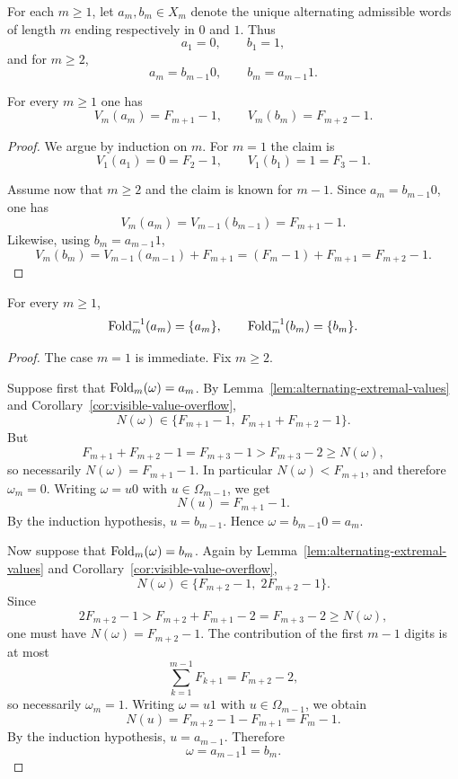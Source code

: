 \begin{definition}
\label{def:alternating-extremal-words}
For each $m\ge 1$, let $a_m,b_m\in X_m$ denote the unique alternating
admissible words of length $m$ ending respectively in $0$ and $1$.  Thus
\[
a_1=0,
\qquad
b_1=1,
\]
and for $m\ge 2$,
\[
a_m=b_{m-1}0,
\qquad
b_m=a_{m-1}1.
\]
\end{definition}

\begin{lemma}
\label{lem:alternating-extremal-values}
For every $m\ge 1$ one has
\[
V_m(a_m)=F_{m+1}-1,
\qquad
V_m(b_m)=F_{m+2}-1.
\]
\end{lemma}

\begin{proof}
We argue by induction on $m$.  For $m=1$ the claim is
\[
V_1(a_1)=0=F_2-1,
\qquad
V_1(b_1)=1=F_3-1.
\]

Assume now that $m\ge 2$ and the claim is known for $m-1$.  Since $a_m=b_{m-1}0$,
one has
\[
V_m(a_m)=V_{m-1}(b_{m-1})=F_{m+1}-1.
\]
Likewise, using $b_m=a_{m-1}1$,
\[
V_m(b_m)=V_{m-1}(a_{m-1})+F_{m+1}
=(F_m-1)+F_{m+1}
=F_{m+2}-1.
\]
\end{proof}

\begin{proposition}
\label{prop:alternating-singleton-fibres}
For every $m\ge 1$,
\[
\operatorname{Fold}_m^{-1}(a_m)=\{a_m\},
\qquad
\operatorname{Fold}_m^{-1}(b_m)=\{b_m\}.
\]
\end{proposition}

\begin{proof}
The case $m=1$ is immediate.  Fix $m\ge 2$.

Suppose first that $\operatorname{Fold}_m(\omega)=a_m$.  By
Lemma~\ref{lem:alternating-extremal-values} and
Corollary~\ref{cor:visible-value-overflow},
\[
N(\omega)\in\{F_{m+1}-1,\;F_{m+1}+F_{m+2}-1\}.
\]
But
\[
F_{m+1}+F_{m+2}-1=F_{m+3}-1>F_{m+3}-2\ge N(\omega),
\]
so necessarily $N(\omega)=F_{m+1}-1$.  In particular $N(\omega)<F_{m+1}$, and
therefore $\omega_m=0$.  Writing $\omega=u0$ with $u\in\Omega_{m-1}$, we get
\[
N(u)=F_{m+1}-1.
\]
By the induction hypothesis, $u=b_{m-1}$.  Hence $\omega=b_{m-1}0=a_m$.

Now suppose that $\operatorname{Fold}_m(\omega)=b_m$.  Again by
Lemma~\ref{lem:alternating-extremal-values} and
Corollary~\ref{cor:visible-value-overflow},
\[
N(\omega)\in\{F_{m+2}-1,\;2F_{m+2}-1\}.
\]
Since
\[
2F_{m+2}-1
>
F_{m+2}+F_{m+1}-2
=
F_{m+3}-2
\ge
N(\omega),
\]
one must have $N(\omega)=F_{m+2}-1$.  The contribution of the first $m-1$
digits is at most
\[
\sum_{k=1}^{m-1}F_{k+1}=F_{m+2}-2,
\]
so necessarily $\omega_m=1$.  Writing $\omega=u1$ with $u\in\Omega_{m-1}$, we
obtain
\[
N(u)=F_{m+2}-1-F_{m+1}=F_m-1.
\]
By the induction hypothesis, $u=a_{m-1}$.  Therefore
\[
\omega=a_{m-1}1=b_m.
\]
\end{proof}


